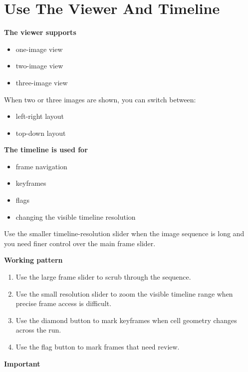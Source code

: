\documentclass[
  9pt,
  letterpaper,
  oneside,
  open=any,
  DIV=15,
  parskip=half-,
  headings=big,
  numbers=noenddot
]{scrbook}
\newcommand{\manuallead}[1]{%
  \vspace{0.15em}%
  {\sffamily\bfseries\color{ManualBlue}#1}\par\nobreak\vspace{0.05em}%
}
\begin{document}
\section{Use The Viewer And Timeline}

\manuallead{The viewer supports}

\begin{itemize}[leftmargin=*,itemsep=0.35em,topsep=0.4em]
\item one-image view
\item two-image view
\item three-image view
\end{itemize}

When two or three images are shown, you can switch between:


\begin{itemize}[leftmargin=*,itemsep=0.35em,topsep=0.4em]
\item left-right layout
\item top-down layout
\end{itemize}

\manuallead{The timeline is used for}

\begin{itemize}[leftmargin=*,itemsep=0.35em,topsep=0.4em]
\item frame navigation
\item keyframes
\item flags
\item changing the visible timeline resolution
\end{itemize}

Use the smaller timeline-resolution slider when the image sequence is long and you need finer control over the main frame slider.


\manuallead{Working pattern}

\begin{enumerate}[leftmargin=*,itemsep=0.35em,topsep=0.4em]
\item Use the large frame slider to scrub through the sequence.
\item Use the small resolution slider to zoom the visible timeline range when precise frame access is difficult.
\item Use the diamond button to mark keyframes when cell geometry changes across the run.
\item Use the flag button to mark frames that need review.
\end{enumerate}

\manuallead{Important}
\end{document}
